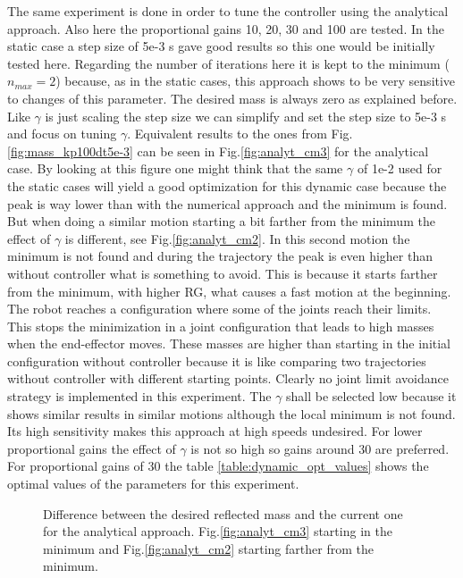 The same experiment is done in order to tune the controller using the analytical approach.
Also here the proportional gains 10, 20, 30 and 100 are tested. In the static case a step size of 5e-3 s gave good results so this one would be initially tested here. Regarding the number of iterations here it is kept to the minimum ($n_{max}=2$) because, as in the static cases, this approach shows to be very sensitive to changes of this parameter.
The desired mass is always zero as explained before. Like $\gamma$ is just scaling the step size we can simplify and set the step size to 5e-3 s and focus on tuning $\gamma$. Equivalent results to the ones from Fig.\ref{fig:mass_kp100dt5e-3} can be seen in Fig.\ref{fig:analyt_cm3} for the analytical case. By looking at this figure one might think that the same $\gamma$ of 1e-2 used for the static cases will yield a good optimization for this dynamic case because the peak is way lower than with the numerical approach and the minimum is found. But when doing a similar motion starting a bit farther from the minimum the effect of $\gamma$ is different, see Fig.\ref{fig:analyt_cm2}. In this second motion the minimum is not found and during the trajectory the peak is even higher than without controller what is something to avoid. This is because it starts farther from the minimum, with higher RG, what causes a fast motion at the beginning. The robot reaches a configuration where some of the joints reach their limits. This stops the minimization in a joint configuration that leads to high masses when the end-effector moves. These masses are higher than starting in the initial configuration without controller because it is like comparing two trajectories without controller with different starting points. Clearly no joint limit avoidance strategy is implemented in this experiment.
The $\gamma$ shall be selected low because it shows similar results in similar motions although the local minimum is not found. Its high sensitivity makes this approach at high speeds undesired.
For lower proportional gains the effect of $\gamma$ is not so high so gains around 30 are preferred.
For proportional gains of 30 the table \ref{table:dynamic_opt_values} shows the optimal values of the parameters for this experiment.



\begin{figure}[!htp!]
	\centering	
	 	 	 	
	\caption{Difference between the desired reflected mass and the current one for the analytical approach.  Fig.\ref{fig:analyt_cm3} starting in the minimum and Fig.\ref{fig:analyt_cm2} starting farther from the minimum.}
	\label{fig:analyt_cm2and3}
\end{figure}





